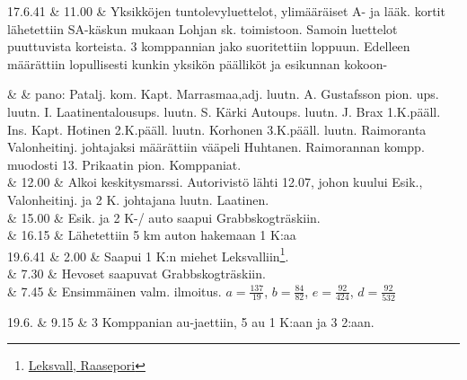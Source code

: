 \documentclass[11pt,a5paper,oneside]{book}
\begin{document}
17.6.41 & 11.00 & Yksikköjen tuntolevyluettelot, ylimääräiset A- ja lääk. kortit lähetettiin SA-käskun mukaan Lohjan sk. toimistoon. Samoin luettelot puuttuvista korteista. 3 komppannian jako suoritettiin loppuun. Edelleen määrättiin lopullisesti kunkin yksikön päälliköt ja esikunnan kokoon- \\
\newpage

& & pano: Patalj. kom. Kapt. Marrasmaa,\newline adj. luutn. A. Gustafsson \newline pion. ups. luutn. I. Laatinen\newline talousups. luutn. S. Kärki \newline Autoups. luutn. J. Brax \newline 1.K.pääll. Ins. Kapt. Hotinen \newline 2.K.pääll. luutn. Korhonen \newline 3.K.pääll. luutn. Raimoranta \newline Valonheitinj. johtajaksi määrättiin vääpeli Huhtanen. \newline Raimorannan kompp. muodosti 13. Prikaatin pion. Komppaniat.\\

& 12.00 & Alkoi keskitysmarssi. Autorivistö lähti 12.07, johon kuului Esik., Valonheitinj. ja 2 K. johtajana luutn. Laatinen. \\

& 15.00 & Esik. ja 2 K-/ auto saapui Grabbskogträskiin. \\

& 16.15 & Lähetettiin 5 km auton hakemaan 1 K:aa \\

19.6.41 & 2.00 & Saapui 1 K:n miehet Leksvalliin\footnote{\href{https://www.google.fi/maps/place/10660+Leksvall/}{Leksvall, Raasepori}}. \\

& 7.30 & Hevoset saapuvat Grabbskogträskiin. \\

& 7.45 & Ensimmäinen valm. ilmoitus. \newline $a=\frac{137}{19}$, $b=\frac{84}{82}$, $e=\frac{92}{424}$, $d=\frac{92}{532}$ \\
\taulustop


19.6. & 9.15 & 3 Komppanian au-jaettiin, 5 au 1 K:aan ja 3 2:aan. \\
\end{document}
